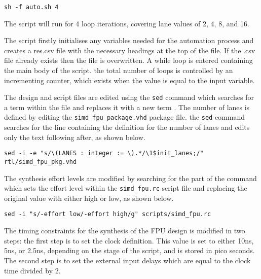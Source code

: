 \documentclass[conference]{IEEEtran}
\begin{document}
\begin{framed}
\begin{verbatim}
sh -f auto.sh 4
\end{verbatim}
\end{framed}

The script will run for 4 loop iterations, covering lane values of 2, 4, 8, and 16. 
\newline

The script firstly initialises any variables needed for the automation process and creates a res.csv file with the necessary headings at the top of the file. If the .csv file already exists then the file is overwritten. A while loop is entered containing the main body of the script. the total number of loops is controlled by an incrementing counter, which exists when the value is equal to the input variable.
\newline

The design and script files are edited using the \texttt{sed} command which searches for a term within the file and replaces it with a new term \cite{sed}. The number of lanes is defined by editing the \texttt{simd\_fpu\_package.vhd} package file. the \texttt{sed} command searches for the line containing the definition for the number of lanes and edits only the text following after, as shown below.

\begin{framed}
\begin{lstlisting}
sed -i -e "s/\(LANES : integer := \).*/\1$init_lanes;/" rtl/simd_fpu_pkg.vhd
\end{lstlisting}
\end{framed}

The synthesis effort levels are modified by searching for the part of the command which sets the effort level within the \texttt{simd\_fpu.rc} script file and replacing the original value with either high or low, as shown below.

\begin{framed}
\begin{lstlisting}
sed -i "s/-effort low/-effort high/g" scripts/simd_fpu.rc
\end{lstlisting}
\end{framed}

The timing constraints for the synthesis of the FPU design is modified in two steps: the first step is to set the clock definition. This value is set to either 10ns, 5ns, or 2.5ns, depending on the stage of the script, and is stored in pico seconds. The second step is to set the external input delays which are equal to the clock time divided by 2. 
\end{document}

